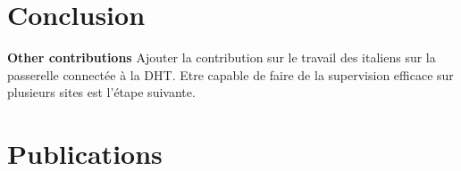 
\section{Conclusion} %
\label{sec:estimators_conclusion}

\lipsum

\textbf{Other contributions} Ajouter la contribution sur le travail des
italiens sur la  passerelle connectée à la DHT. Etre capable de faire de la
supervision efficace sur plusieurs sites est l'étape suivante.


\section{Publications} %
\label{sec:estimators_publications}


